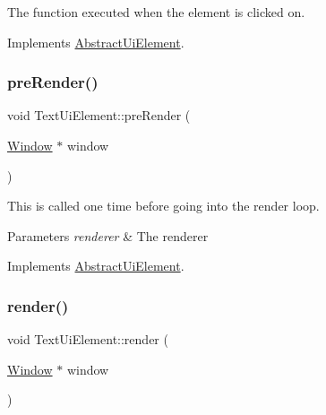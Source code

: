 The function executed when the element is clicked on. 



Implements \mbox{\hyperlink{class_abstract_ui_element_a42296c15c9e70b6ac7fda0b1862612af}{Abstract\+Ui\+Element}}.

\mbox{\label{class_text_ui_element_afe15a4085bc4b7c2cf8668cb6d7fd45d}} 
\subsubsection{\texorpdfstring{pre\+Render()}{preRender()}}
{\footnotesize\ttfamily void Text\+Ui\+Element\+::pre\+Render (\begin{DoxyParamCaption}\item[{\mbox{\hyperlink{class_window}{Window}} $\ast$}]{window }\end{DoxyParamCaption})\hspace{0.3cm}{\ttfamily [virtual]}}

This is called one time before going into the render loop. 


\begin{DoxyParams}{Parameters}
{\em renderer} & The renderer\\
\hline
\end{DoxyParams}


Implements \mbox{\hyperlink{class_abstract_ui_element_a859f627ab385e9d3bf6ce8db40607cdb}{Abstract\+Ui\+Element}}.

\mbox{\label{class_text_ui_element_a636883070224511baea505f4ad4655d9}} 
\subsubsection{\texorpdfstring{render()}{render()}}
{\footnotesize\ttfamily void Text\+Ui\+Element\+::render (\begin{DoxyParamCaption}\item[{\mbox{\hyperlink{class_window}{Window}} $\ast$}]{window }\end{DoxyParamCaption})\hspace{0.3cm}{\ttfamily [virtual]}}



